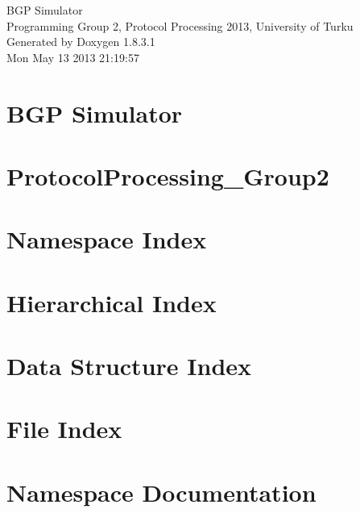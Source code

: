 \documentclass{book}
\begin{document}
\hypersetup{pageanchor=false,citecolor=blue}
\begin{titlepage}
\vspace*{7cm}
\begin{center}
{\Large B\-G\-P Simulator \\[1ex]\large Programming Group 2, Protocol Processing 2013, University of Turku }\\
\vspace*{1cm}
{\large Generated by Doxygen 1.8.3.1}\\
\vspace*{0.5cm}
{\small Mon May 13 2013 21:19:57}\\
\end{center}
\end{titlepage}
\clearemptydoublepage
{}
\tableofcontents
\clearemptydoublepage
{}
\hypersetup{pageanchor=true,citecolor=blue}
\chapter{B\-G\-P Simulator}
\label{index}\hypertarget{index}{}
\chapter{Protocol\-Processing\-\_\-\-Group2}
\label{md_README}
\hypertarget{md_README}{}

\chapter{Namespace Index}

\chapter{Hierarchical Index}

\chapter{Data Structure Index}

\chapter{File Index}

\chapter{Namespace Documentation}


\end{document}

